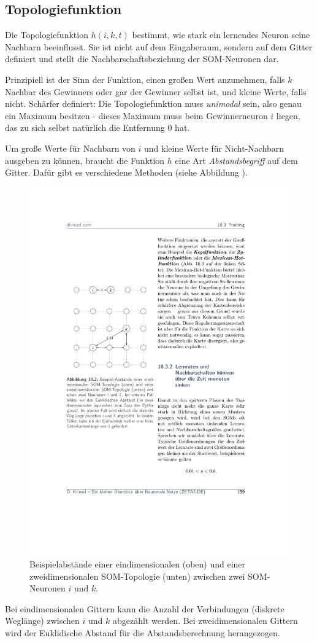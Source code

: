 \subsection*{Topologiefunktion}
Die Topologiefunktion $h(i,k,t)$ bestimmt, wie stark ein lernendes Neuron seine Nachbarn beeinflusst. Sie ist nicht auf dem Eingaberaum, sondern auf dem Gitter definiert und stellt die Nachbarschaftsbeziehung der SOM-Neuronen dar.

Prinzipiell ist der Sinn der Funktion, einen großen Wert anzunehmen, falls $k$ Nachbar des Gewinners oder gar der Gewinner selbst ist, und kleine Werte, falls nicht.
Schärfer definiert: Die Topologiefunktion muss \emph{unimodal} sein, also genau ein Maximum besitzen - dieses Maximum muss beim Gewinnerneuron $i$ liegen, das zu sich selbst natürlich die Entfernung $0$ hat.

Um große Werte für Nachbarn von $i$ und kleine Werte für Nicht-Nachbarn ausgeben zu können, braucht die Funktion $h$ eine Art \emph{Abstandsbegriff} auf dem Gitter. Dafür gibt es verschiedene Methoden (siehe Abbildung ).

\begin{figure}[ht!] \centering 
	\includegraphics[width=0.5\linewidth]{figures/ch08_som-abstand-auf-gitter.pdf}
	\caption{Beispielabstände einer eindimensionalen (oben) und einer zweidimensionalen SOM-Topologie (unten) zwischen zwei SOM-Neuronen $i$ und $k$.}
	\label{fig:ch08_som-abstand-auf-gitter}
\end{figure}

Bei eindimensionalen Gittern kann die Anzahl der Verbindungen (diskrete Weglänge) zwischen $i$ und $k$ abgezählt werden.
Bei zweidimensionalen Gittern wird der Euklidische Abstand für die Abstandsberechnung herangezogen.

